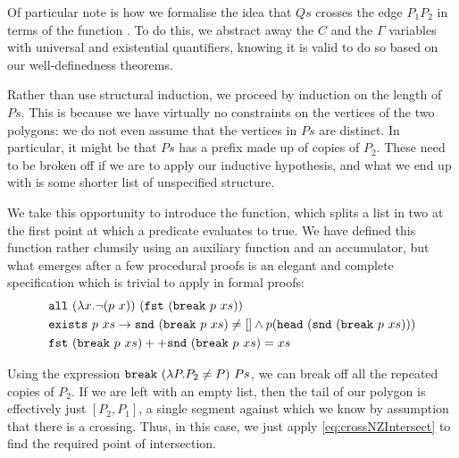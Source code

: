 Of particular note is how we formalise the idea that $Qs$ crosses the edge $P_1P_2$ in terms of the function . To do this, we abstract away the $C$ and the $\Gamma$ variables with universal and existential quantifiers, knowing it is valid to do so based on our well-definedness theorems.

Rather than use structural induction, we proceed by induction on the length of $Ps$. This is because we have virtually no constraints on the vertices of the two polygons: we do not even assume that the vertices in $Ps$ are distinct. In particular, it might be that $Ps$ has a prefix made up of copies of $P_2$. These need to be broken off if we are to apply our inductive hypothesis, and what we end up with is some shorter list of unspecified structure.

We take this opportunity to introduce the  function, which splits a list in two at the first point at which a predicate evaluates to true. We have defined this function rather clumsily using an auxiliary function and an accumulator, but what emerges after a few procedural proofs is an elegant and complete specification which is trivial to apply in formal proofs:
\begin{align*}
&\code{all}\ (\lambda x. \neg(p\ x))\ (\code{fst}\ (\code{break}\ p\ xs))\\
&\code{exists}\ p\ xs \rightarrow \code{snd}\ (\code{break}\ p\ xs) \neq [] \wedge p (\code{head}\ (\code{snd}\ (\code{break}\ p\ xs)))\\
&\append{\code{fst}\ (\code{break}\ p\ xs)}{\code{snd}\ (\code{break}\ p\ xs)} = xs
\end{align*}

Using the expression $\code{break}\ (\lambda P. P_2 \neq P)\ Ps$, we can break off all the repeated copies of $P_2$. If we are left with an empty list, then the tail of our polygon is effectively just $[P_2,P_1]$, a single segment against which we know by assumption that there is a crossing. Thus, in this case, we just apply  \ref{eq:crossNZIntersect} to find the required point of intersection. 

